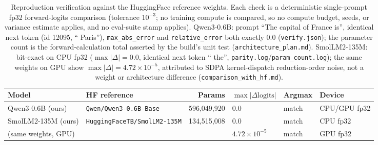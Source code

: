 \begin{table}[t]
\centering
\small
\setlength{\tabcolsep}{4.5pt}
\begin{tabular}{@{}llrlll@{}}
\toprule
Model & HF reference & Params & $\max|\Delta\text{logits}|$ & Argmax & Device \\
\midrule
Qwen3-0.6B (ours) & \texttt{Qwen/Qwen3-0.6B-Base} & 596{,}049{,}920 & $0.0$ & match & CPU/GPU fp32 \\
SmolLM2-135M (ours) & \texttt{HuggingFaceTB/SmolLM2-135M} & 134{,}515{,}008 & $0.0$ & match & CPU fp32 \\
\quad (same weights, GPU) & & & $4.72\times10^{-5}$ & match & GPU fp32 \\
\bottomrule
\end{tabular}
\caption{Reproduction verification against the HuggingFace reference weights.
Each check is a deterministic single-prompt fp32 forward-logits comparison
(tolerance $10^{-3}$; no training compute is compared, so no compute budget,
seeds, or variance estimate applies, and no eval-suite stamp applies).
Qwen3-0.6B: prompt ``The capital of France is'', identical next token
(id 12095, `` Paris''), \texttt{max\_abs\_error} and \texttt{relative\_error}
both exactly $0.0$ (\texttt{verify.json}); the parameter count is the
forward-calculation total asserted by the build's unit test
(\texttt{architecture\_plan.md}). SmolLM2-135M: bit-exact on CPU fp32
($\max|\Delta| = 0.0$, identical next token `` the'',
\texttt{parity.log}/\texttt{param\_count.log}); the same weights on GPU show
$\max|\Delta| = 4.72\times10^{-5}$, attributed to SDPA kernel-dispatch
reduction-order noise, not a weight or architecture difference
(\texttt{comparison\_with\_hf.md}).}
\label{tab:repro}
\end{table}
